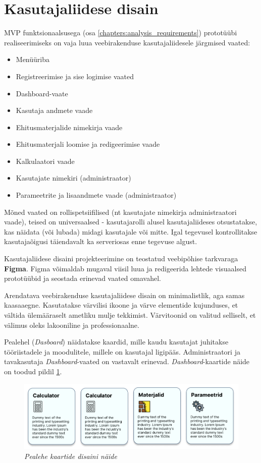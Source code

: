 \section{Kasutajaliidese disain}
\label{chapters:analysis_interface_design}
MVP funktsionaalsusega (osa \ref{chapters:analysis_requirements}) prototüübi  realiseerimiseks on vaja luua
veebirakenduse kasutajaliidesele järgmised vaated:
\begin{itemize}
    \item Menüüriba
    \item Registreerimise ja sise logimise vaated
    \item Dashboard-vaate
    \item Kasutaja andmete vaade
    \item Ehitusmaterjalide nimekirja vaade
    \item Ehitusmaterjali loomise ja redigeerimise vaade
    \item Kalkulaatori vaade
    \item Kasutajate nimekiri (administraator)
    \item Parameetrite ja lisaandmete vaade (administraator)
\end{itemize}

Mõned vaated on rollispetsiifilised (nt kasutajate nimekirja administraatori vaade), teised on universaalsed - 
kasutajarolli alusel kasutajaliideses otsustatakse, kas näidata (või lubada) midagi kasutajale või mitte.
Igal tegevusel kontrollitakse kasutajaõigusi täiendavalt ka serveriosas enne tegevuse algust.

Kasutajaliidese disaini projekteerimine on teostatud veebipõhise tarkvaraga \textbf{Figma}. Figma võimaldab 
mugaval viisil luua ja redigeerida lehtede visuaalsed prototüübid ja seostada erinevad vaated omavahel. 

Arendatava veebirakenduse kasutajaliidese disain on minimalistlik, aga samas kaasaaegne. Kasutatakse värvilisi ikoone ja värve
elementide kujunduses, et vältida ülemääraselt ametliku mulje tekkimist. Värvitoonid on valitud selliselt, et 
välimus oleks lakooniline ja professionaalne.

Pealehel (\textit{Dasboard}) näidatakse kaardid, mille kaudu kasutajat juhitakse tööriistadele ja 
moodulitele, millele on kasutajal ligipääs. Administraatori ja tavakasutaja \textit{Dashboard}-vaated
on vastavalt erinevad. \textit{Dashboard}-kaartide näide on toodud pildil \ref{fig:desing_dashboard_cards}.
\begin{figure}[ht]
    \centering
    \includegraphics[width=1\textwidth]{figures/analysis/desing_dashboard_cards.png}
    \caption[Pealehe kaartide disaini näide]{\textit{Pealehe kaartide disaini näide}}
    \label{fig:desing_dashboard_cards}
\end{figure}


